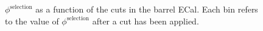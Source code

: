 \begin{figure}
\begin{minipage}{.5\linewidth}
\centering
{}
\end{minipage}\par\medskip
\caption{$\phi^{\textrm{selection}}$ as a function of the cuts in the barrel ECal.  Each bin refers to the value of $\phi^{\textrm{selection}}$ after a cut has been applied.}
\label{fig:SelFOMCutLevelBarrel}
\end{figure}
